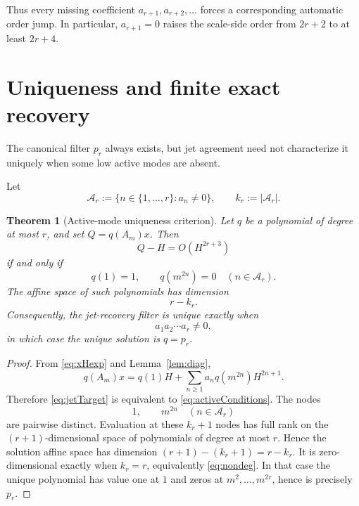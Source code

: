 \documentclass[11pt]{article}
\newtheorem{theorem}{Theorem}[section]
\theoremstyle{remark}
\begin{document}
Thus every missing coefficient
\(a_{r+1},a_{r+2},\ldots\) forces a corresponding automatic order jump.
In particular, \(a_{r+1}=0\) raises the scale-side order from
\(2r+2\) to at least \(2r+4\).

\section{Uniqueness and finite exact recovery}

The canonical filter \(p_r\) always exists, but jet agreement need not
characterize it uniquely when some low active modes are absent.

Let
\begin{equation}
\mathcal A_r
:=
\{n\in\{1,\ldots,r\}:a_n\neq0\},
\qquad
k_r:=|\mathcal A_r|.
\label{eq:activeSet}
\end{equation}

\begin{theorem}[Active-mode uniqueness criterion]
\label{thm:uniqueness}
Let \(q\) be a polynomial of degree at most \(r\), and set
\(Q=q(A_m)x\).  Then
\begin{equation}
Q-H=O(H^{2r+3})
\label{eq:jetTarget}
\end{equation}
if and only if
\begin{equation}
q(1)=1,
\qquad
q(m^{2n})=0
\quad(n\in\mathcal A_r).
\label{eq:activeConditions}
\end{equation}
The affine space of such polynomials has dimension
\begin{equation}
\boxed{r-k_r.}
\label{eq:dimension}
\end{equation}
Consequently, the jet-recovery filter is unique exactly when
\begin{equation}
\boxed{a_1a_2\cdots a_r\neq0,}
\label{eq:nondeg}
\end{equation}
in which case the unique solution is \(q=p_r\).
\end{theorem}

\begin{proof}
From \eqref{eq:xHexp} and Lemma~\ref{lem:diag},
\[
q(A_m)x
=
q(1)H+
\sum_{n\ge1}a_nq(m^{2n})H^{2n+1}.
\]
Therefore \eqref{eq:jetTarget} is equivalent to
\eqref{eq:activeConditions}.  The nodes
\[
1,
\qquad
m^{2n}\quad(n\in\mathcal A_r)
\]
are pairwise distinct.  Evaluation at these \(k_r+1\) nodes has full rank
on the \((r+1)\)-dimensional space of polynomials of degree at most \(r\).
Hence the solution affine space has dimension
\((r+1)-(k_r+1)=r-k_r\).  It is zero-dimensional exactly when
\(k_r=r\), equivalently \eqref{eq:nondeg}.  In that case the unique
polynomial has value one at \(1\) and zeros at
\(m^2,\ldots,m^{2r}\), hence is precisely \(p_r\).
\end{proof}
\end{document}
